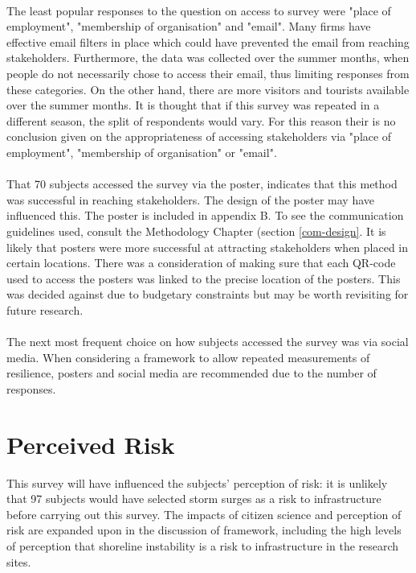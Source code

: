 \paragraph{}
The least popular responses to the question on access to survey were "place of employment", "membership of organisation" and "email". Many firms have effective email filters in place which could have prevented the email from reaching stakeholders. Furthermore, the data was collected over the summer months, when people do not necessarily chose to access their email, thus limiting responses from these categories. On the other hand, there are more visitors and tourists available over the summer months. It is thought that if this survey was repeated in a different season, the split of respondents would vary. For this reason their is no conclusion given on the appropriateness of accessing stakeholders via "place of employment", "membership of organisation" or "email".
\paragraph{}
That 70 subjects accessed the survey via the poster, indicates that this method was successful in reaching stakeholders. The design of the poster may have influenced this. The poster is included in appendix B. To see the communication guidelines used, consult the Methodology Chapter (section \ref{com-design}. It is likely that posters were more successful at attracting stakeholders when placed in certain locations. There was a consideration of making sure that each QR-code used to access the posters was linked to the precise location of the posters. This was decided against due to budgetary constraints but may be worth revisiting for future research.

\paragraph{}
The next most frequent choice on how subjects accessed the survey was via social media. When considering a framework to allow repeated measurements of resilience, posters and social media are recommended due to the number of responses. 
\paragraph{}

\section{Perceived Risk}\label{discuss-percieved.risk}
This survey will have influenced the subjects' perception of risk: it is unlikely that 97 subjects would have selected storm surges as a risk to infrastructure before carrying out this survey. The impacts of citizen science and perception of risk are expanded upon in the discussion of framework, including the high levels of perception that shoreline instability is a risk to infrastructure in the research sites.

